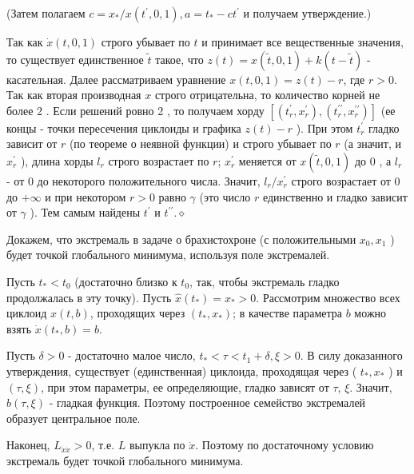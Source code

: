 \begin{task}
(Затем полагаем $c=x_{*} / x\left(t^{\prime}, 0,1\right), a=t_{*}-c t^{\prime}$ и получаем утверждение.)

Так как $\dot{x}(t, 0,1)$ строго убывает по $t$ и принимает все вещественные значения, то существует единственное $\tilde{t}$ такое, что $z(t)=x(\tilde{t}, 0,1)+k(t-\tilde{t})$ - касательная. Далее рассматриваем уравнение $x(t, 0,1)=z(t)-r$, где $r>0$. Так как вторая производная $x$ строго отрицательна, то количество корней не более 2 . Если решений ровно 2 , то получаем хорду $\left[\left(t_{r}^{\prime}, x_{r}^{\prime}\right),\left(t_{r}^{\prime \prime}, x_{r}^{\prime \prime}\right)\right]$ (ее концы - точки пересечения циклоиды и графика $z(t)-r$ ). При этом $t_{r}^{\prime}$ гладко зависит от $r$ (по теореме о неявной функции) и строго убывает по $r$ (а значит, и $x_{r}^{\prime}$ ), длина хорды $l_{r}$ строго возрастает по $r$; $x_{r}^{\prime}$ меняется от $x(\tilde{t}, 0,1)$ до 0 , а $l_{r}$ - от 0 до некоторого положительного числа. Значит, $l_{r} / x_{r}^{\prime}$ строго возрастает от 0 до $+\infty$ и при некотором $r>0$ равно $\gamma$ (это число $r$ единственно и гладко зависит от $\gamma$ ). Тем самым найдены $t^{\prime}$ и $t^{\prime \prime} . \diamond$

Докажем, что экстремаль в задаче о брахистохроне (с положительными $x_{0}, x_{1}$ ) будет точкой глобального минимума, используя поле экстремалей.

Пусть $t_{*}<t_{0}$ (достаточно близко к $t_{0}$, так, чтобы экстремаль гладко продолжалась в эту точку). Пусть $\hat{x}\left(t_{*}\right)=x_{*}>0$. Рассмотрим множество всех циклоид $x(t, b)$, проходящих через $\left(t_{*}, x_{*}\right)$; в качестве параметра $b$ можно взять $\dot{x}\left(t_{*}, b\right)=b$.

Пусть $\delta>0$ - достаточно малое число, $t_{*}<\tau<t_{1}+\delta, \xi>0$. В силу доказанного утверждения, существует (единственная) циклоида, проходящая через ( $t_{*}, x_{*}$ ) и $(\tau, \xi)$, при этом параметры, ее определяющие, гладко зависят от $\tau$, $\xi$. Значит, $b(\tau, \xi)$ - гладкая функция. Поэтому построенное семейство экстремалей образует центральное поле.

Наконец, $L_{\dot{x} \dot{x}}>0$, т.е. $L$ выпукла по $\dot{x}$. Поэтому по достаточному условию экстремаль будет точкой глобального минимума.
\end{task}